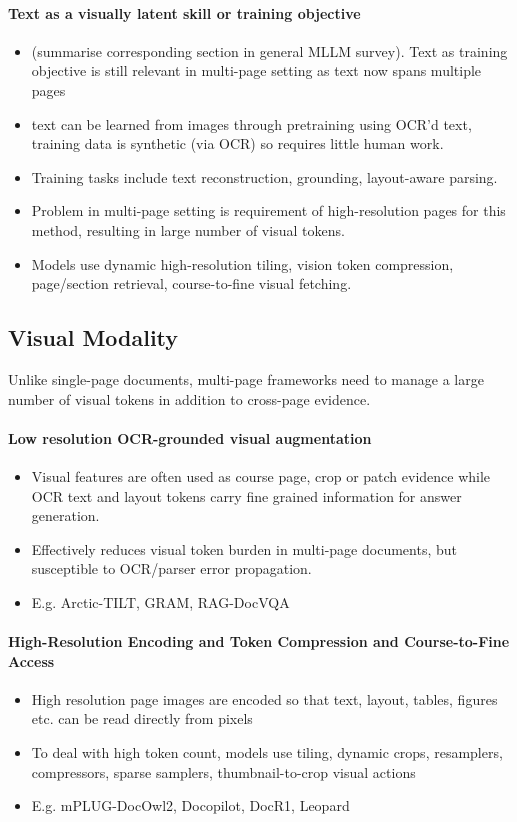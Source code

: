 \documentclass[11pt]{article}
\begin{document}
\paragraph{Text as a visually latent skill or training objective}
\begin{itemize}
    \item (summarise corresponding section in general MLLM survey). Text as training objective is still relevant in multi-page setting as text now spans multiple pages
    \item text can be learned from images through pretraining using OCR'd text, training data is synthetic (via OCR) so requires little human work.
    \item Training tasks include text reconstruction, grounding, layout-aware parsing.
    \item Problem in multi-page setting is requirement of high-resolution pages for this method, resulting in large number of visual tokens.
    \item Models use dynamic high-resolution tiling, vision token compression, page/section retrieval, course-to-fine visual fetching.
\end{itemize}

\subsection{Visual Modality}
Unlike single-page documents, multi-page frameworks need to manage a large number of visual tokens in addition to cross-page evidence.

\paragraph{Low resolution OCR-grounded visual augmentation}
\begin{itemize}
    \item Visual features are often used as course page, crop or patch evidence while OCR text and layout tokens carry fine grained information for answer generation.
    \item Effectively reduces visual token burden in multi-page documents, but susceptible to OCR/parser error propagation.
    \item E.g. Arctic-TILT, GRAM, RAG-DocVQA
\end{itemize}

\paragraph{High-Resolution Encoding and Token Compression and Course-to-Fine Access}
\begin{itemize}
    \item High resolution page images are encoded so that text, layout, tables, figures etc. can be read directly from pixels
    \item To deal with high token count, models use tiling, dynamic crops, resamplers, compressors, sparse samplers, thumbnail-to-crop visual actions
    \item E.g. mPLUG-DocOwl2, Docopilot, DocR1, Leopard
\end{itemize}
\end{document}
